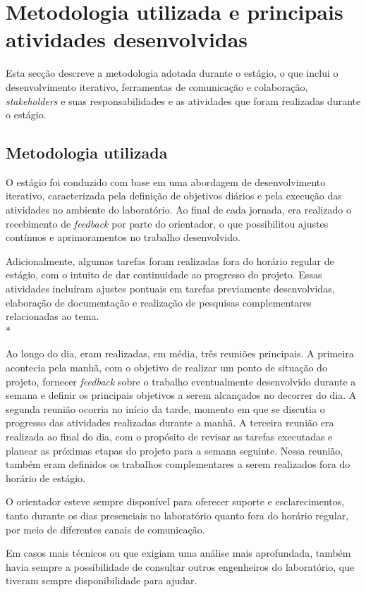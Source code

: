 \section{Metodologia utilizada e principais atividades desenvolvidas}

Esta secção descreve a metodologia adotada durante o estágio, o que inclui
o desenvolvimento iterativo, ferramentas de comunicação e colaboração, \textit{stakeholders}
e suas responsabilidades e as atividades que foram realizadas durante o estágio.

\subsection{Metodologia utilizada}
O estágio foi conduzido com base em uma abordagem de desenvolvimento iterativo, caracterizada pela definição de 
objetivos diários e pela execução das atividades no ambiente do laboratório. Ao final de cada jornada, era realizado 
o recebimento de \textit{feedback} por parte do orientador, o que possibilitou ajustes contínuos e aprimoramentos no 
trabalho desenvolvido.

Adicionalmente, algumas tarefas foram realizadas fora do horário regular de estágio, com o intuito de dar continuidade
ao progresso do projeto. Essas atividades incluíram ajustes pontuais em tarefas previamente desenvolvidas, elaboração
de documentação e realização de pesquisas complementares relacionadas ao tema. \\*

Ao longo do dia, eram realizadas, em média, três reuniões principais. A primeira acontecia pela manhã, com o objetivo de 
realizar um ponto de situação do projeto, fornecer \textit{feedback} sobre o trabalho eventualmente desenvolvido durante a semana e 
definir os principais objetivos a serem alcançados no decorrer do dia. A segunda reunião ocorria no início da tarde, 
momento em que se discutia o progresso das atividades realizadas durante a manhã. A terceira reunião era realizada ao 
final do dia, com o propósito de revisar as tarefas executadas e planear as próximas etapas do projeto para a semana 
seguinte. Nessa reunião, também eram definidos os trabalhos complementares a serem realizados fora do horário de estágio.

O orientador esteve sempre disponível para oferecer suporte e esclarecimentos, tanto durante os dias presenciais no 
laboratório quanto fora do horário regular, por meio de diferentes canais de comunicação.

Em casos mais técnicos ou que exigiam uma análise mais aprofundada, também havia sempre a possibilidade de consultar outros engenheiros do laboratório, que tiveram sempre disponibilidade 
para ajudar.

